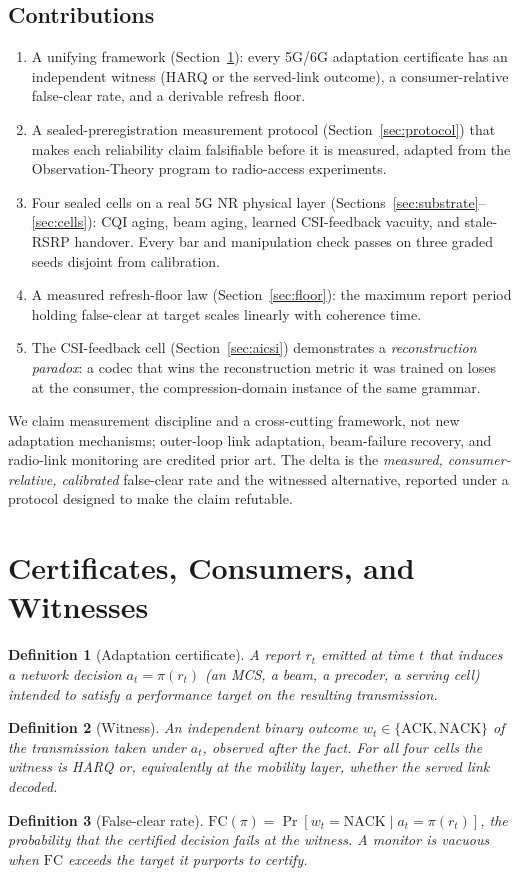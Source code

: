 \documentclass[lettersize,onecolumn]{IEEEtran}
\newtheorem{definition}{Definition}
\theoremstyle{remark}
\newcommand{\fc}{\mathrm{FC}}
\begin{document}
\subsection{Contributions}
\begin{enumerate}
\item A unifying framework (Section~\ref{sec:framework}): every 5G/6G adaptation
certificate has an independent witness (HARQ or the served-link outcome), a
consumer-relative false-clear rate, and a derivable refresh floor.
\item A sealed-preregistration measurement protocol (Section~\ref{sec:protocol})
that makes each reliability claim falsifiable before it is measured, adapted
from the Observation-Theory program to radio-access experiments.
\item Four sealed cells on a real 5G NR physical layer
(Sections~\ref{sec:substrate}--\ref{sec:cells}): CQI aging, beam aging, learned
CSI-feedback vacuity, and stale-RSRP handover. Every bar and manipulation check
passes on three graded seeds disjoint from calibration.
\item A measured refresh-floor law (Section~\ref{sec:floor}): the maximum report
period holding false-clear at target scales linearly with coherence time.
\item The CSI-feedback cell (Section~\ref{sec:aicsi}) demonstrates a
\emph{reconstruction paradox}: a codec that wins the reconstruction metric it was
trained on loses at the consumer, the compression-domain instance of the same
grammar.
\end{enumerate}
We claim measurement discipline and a cross-cutting framework, not new
adaptation mechanisms; outer-loop link adaptation, beam-failure recovery, and
radio-link monitoring are credited prior art. The delta is the
\emph{measured, consumer-relative, calibrated} false-clear rate and the
witnessed alternative, reported under a protocol designed to make the claim
refutable.

\section{Certificates, Consumers, and Witnesses}\label{sec:framework}
\begin{definition}[Adaptation certificate]
A report $r_t$ emitted at time $t$ that induces a network decision
$a_t=\pi(r_t)$ (an MCS, a beam, a precoder, a serving cell) intended to satisfy a
performance target on the resulting transmission.
\end{definition}
\begin{definition}[Witness]
An independent binary outcome $w_t\in\{\text{ACK},\text{NACK}\}$ of the
transmission taken under $a_t$, observed after the fact. For all four cells the
witness is HARQ or, equivalently at the mobility layer, whether the served link
decoded.
\end{definition}
\begin{definition}[False-clear rate]
$\fc(\pi)=\Pr[w_t=\text{NACK}\mid a_t=\pi(r_t)]$, the probability that the
certified decision fails at the witness. A monitor is \emph{vacuous} when
$\fc$ exceeds the target it purports to certify.
\end{definition}
\end{document}
